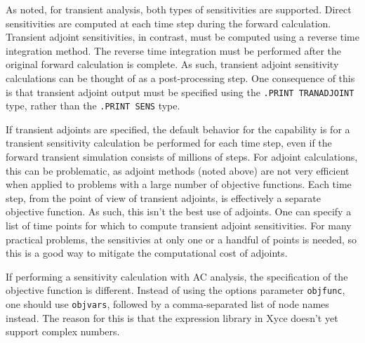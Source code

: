 \begin{Command}
As noted, for transient analysis, both types of sensitivities are supported.
Direct sensitivities are computed at each time step during the forward 
calculation.  Transient adjoint sensitivities, in contrast, must be computed
using a reverse time integration method.  The reverse time integration must be 
performed after the original forward calculation is complete.  As such, transient 
adjoint sensitivity calculations can be thought of as a post-processing step.  
One consequence of this is that transient adjoint output must be specified using 
the \texttt{.PRINT TRANADJOINT} type, rather than the \texttt{.PRINT SENS} 
type.

If transient adjoints are specified, the default behavior for the capability is 
for a transient sensitivity calculation be performed for each time step, even 
if the forward transient simulation consists of millions of steps.  For adjoint 
calculations, this can be problematic, as adjoint methods (noted above) are not 
very efficient when applied to problems with a large number of objective functions.
Each time step, from the point of view of transient adjoints, is effectively a 
separate objective function.  As such, this isn't the best use of adjoints.  
One can specify  a list of time points for which to compute transient adjoint
sensitivities. For many practical problems, the sensitivies at only one or a 
handful of points is needed, so this is a good way to mitigate the computational 
cost of adjoints.

If performing a sensitivity calculation with AC analysis, the specification of the 
objective function is different.  Instead of using the options parameter \texttt{objfunc}, 
one should use \texttt{objvars}, followed by a comma-separated list of node names instead.  The reason 
for this is that the expression library in Xyce doesn't yet support complex numbers.

\end{Command}
